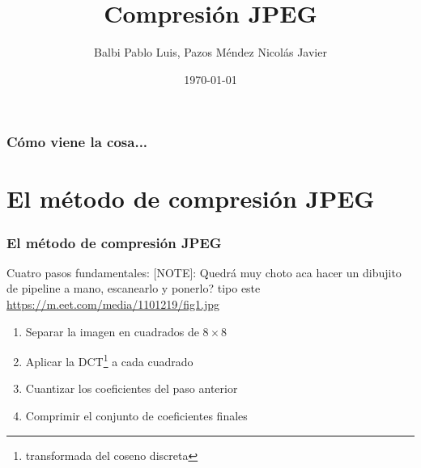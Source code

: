 \documentclass{beamer}
\begin{document}
\title{Compresión JPEG}
\author{Balbi Pablo Luis, Pazos Méndez Nicolás Javier}
\date{\today}

\begin{frame}
    \titlepage
\end{frame}

\begin{frame}
    \frametitle{Cómo viene la cosa...}
    \tableofcontents[hideallsubsections]
\end{frame}

\section{El método de compresión JPEG}
\begin{frame}
    \frametitle{El método de compresión JPEG}
        Cuatro pasos fundamentales:
        [NOTE]: Quedrá muy choto aca hacer un dibujito de pipeline a mano, escanearlo y ponerlo?
        tipo este \url{https://m.eet.com/media/1101219/fig1.jpg}
        \begin{enumerate}
            \item Separar la imagen en cuadrados de $8 \times 8$
            \item Aplicar la DCT\footnote{transformada del coseno discreta} a cada cuadrado
            \item Cuantizar los coeficientes del paso anterior
            \item Comprimir el conjunto de coeficientes finales
        \end{enumerate}

\end{frame}
\end{document}
